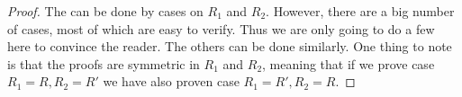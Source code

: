 \begin{proof}

  The can be done by cases on $R_1$ and $R_2$. However, there are a big number
  of cases, most of which are easy to verify. Thus we are only going to do a few
  here to convince the reader. The others can be done similarly. One thing to
  note is that the proofs are symmetric in $R_1$ and $R_2$, meaning that if we
  prove case $R_1 = R, R_2 = R'$ we have also proven case $R_1 = R', R_2 = R$.


\end{proof}
